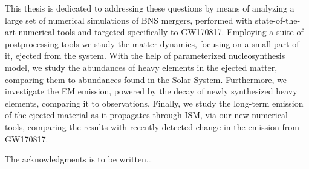 \documentclass[
openright,
12pt, %
english,%
onehalfspacing, %
nolistspacing, %
nohyperref, %
headsepline, %
]{MastersDoctoralThesis} %
\newcommand{\GW}{GW170817}
\newcommand{\pmerg}{post-merger}
\newcommand{\nuc}{nucleosynthesis}
\begin{document}
    This thesis is dedicated to addressing these questions by means of analyzing a 
    large set of numerical simulations of \ac{BNS} mergers, performed with state-of-the-art 
    numerical tools and targeted specifically to \GW{}. 
    Employing a suite of postprocessing tools we study the matter dynamics, 
    focusing on a small part of it, ejected from the system. With the help of parameterized 
    \nuc{} model, we study the abundances of heavy elements in the ejected matter, 
    comparing them to abundances found in the Solar System. 
    Furthermore, we investigate the \ac{EM} emission, 
    powered by the decay of newly synthesized heavy elements, comparing it to observations. 
    Finally, we study the long-term emission of the ejected 
    material as it propagates through \ac{ISM}, via our new numerical tools, 
    comparing the results with recently detected change in the emission from \GW{}.
    
    
    




\makeatletter
\renewcommand\@biblabel[1]{}
\makeatother

\begingroup
\def\refname{Published content and contributions}
\def\bibname{Published content and contributions}

\endgroup




\begin{acknowledgements}
    \addchaptertocentry{\acknowledgementname} %
    The acknowledgments is to be written\ldots
\end{acknowledgements}

\end{document}
